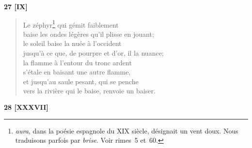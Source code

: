\bigskip

\begin{center}
  \textbf{27 [IX]}
\end{center}

\begin{verse}
  Le zéphyr\footnote{\emph{aura}, dans la poésie espagnole du XIX\ieme{}
  siècle, désignait un vent doux. Nous traduisons parfois par
  \emph{brise}. Voir rimes~5 et~60.} qui gémit faiblement \\
  baise les ondes légères qu'il plisse en jouant; \\
  le soleil baise la nuée à l'occident \\
  jusqu'à ce que, de pourpre et d'or, il la nuance; \\
  la flamme à l'entour du tronc ardent \\
  s'étale en baisant une autre flamme, \\
  et jusqu'au saule pesant, qui se penche \\
  vers la rivière qui le baise, renvoie un baiser.
\end{verse}

\pagebreak

\begin{center}
  \textbf{28 [XXXVII]}
\end{center}

